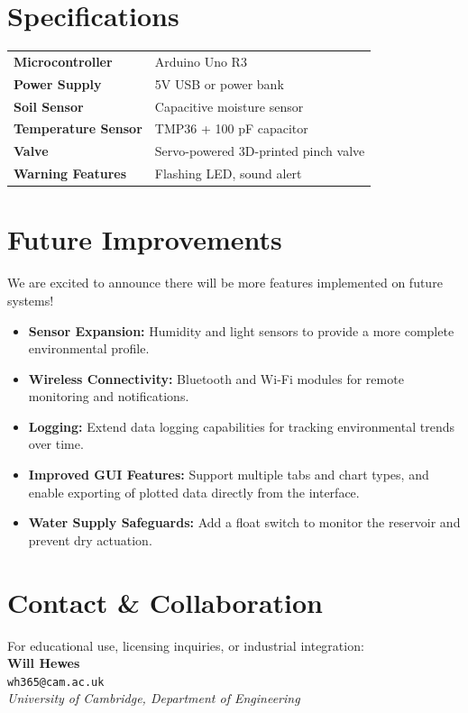\documentclass[a4paper,11pt]{article}
\begin{document}
\section*{Specifications}
\vspace{-01em}
\begin{table}[H]
    \centering
    \begin{tabularx}{0.8\textwidth}{>{\bfseries}l X}
        Microcontroller & Arduino Uno R3 \\
        Power Supply & 5V USB or power bank \\
        Soil Sensor & Capacitive moisture sensor \\
        Temperature Sensor & TMP36 + 100 pF capacitor \\
        Valve & Servo-powered 3D-printed pinch valve \\
        Warning Features & Flashing LED, sound alert  \\
    \end{tabularx}
    \label{tab:system_overview}
\end{table}

\section*{Future Improvements}
We are excited to announce there will be more features implemented 
on future systems!

\begin{itemize}[leftmargin=1.5em, nosep]
    \item \textbf{Sensor Expansion:} 
    Humidity and light sensors 
    to provide a more complete environmental profile.
    \item \textbf{Wireless Connectivity:} Bluetooth and Wi-Fi modules for 
    remote monitoring and notifications.
    \item \textbf{Logging:} Extend data logging capabilities 
    for tracking environmental trends over time.
    \item \textbf{Improved GUI Features:} Support multiple tabs and chart types, 
    and enable exporting of plotted data directly from the interface.
    \item \textbf{Water Supply Safeguards:} 
    Add a float switch to monitor the reservoir and prevent dry actuation.
\end{itemize}


\section*{Contact \& Collaboration}
For educational use, licensing inquiries, or industrial integration:\\

\noindent
\textbf{Will Hewes} \\
\texttt{wh365@cam.ac.uk} \\
\textit{University of Cambridge, Department of Engineering}
\end{document}

